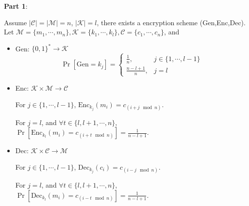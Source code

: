\documentclass[12pt]{article}
\newcommand{\K}{\mathcal{K}}
\newcommand{\M}{\mathcal{M}}
\newcommand{\C}{\mathcal{C}}
\newcommand{\Enc}{\text{Enc}}
\newcommand{\Dec}{\text{Dec}}
\newcommand{\Gen}{\text{Gen}}
\newenvironment{problem}[2][Problem]{\begin{trivlist}
\item[\hskip \labelsep {\bfseries #1}\hskip \labelsep {\bfseries #2.}]}{\end{trivlist}}
\begin{document}
\begin{problem}{2.11} 
\textbf{Part 1}:\par
Assume $\mid\C\mid=\mid\M\mid=n$, $\mid\K\mid=l$, there exists a encryption scheme (Gen,Enc,Dec). Let $\M=\{m_1,\cdots,m_n\},\K=\{k_1,\cdots,k_l\},\C=\{c_1,\cdots,c_n\}$, and\begin{itemize}
    \item Gen: $\{0,1\}^*\rightarrow\K$
		\begin{equation*}  
			\Pr[\Gen=k_j]= \begin{cases}
					\frac 1n, &  j\in\{1,\cdots,l-1\} \\  
					\frac {n-l+1}{n}, & j=l  
				\end{cases} 
		\end{equation*}
    \item Enc: $\K\times\M\rightarrow\C$\par
    For $j\in\{1,\cdots,l-1\}$, $\Enc_{k_j}(m_i)=c_{(i+j\mod n)}$.\par
    For $j=l$, and $\forall t\in\{l,l+1,\cdots,n\}$, $\Pr[\Enc_{k_l}(m_i)=c_{(i+t \mod n)}]=\frac {1}{n-l+1}$.
    \item Dec: $\K\times\C\rightarrow\M$ \par
    For $j\in\{1,\cdots,l-1\}$, $\Dec_{k_j}(c_i)=c_{(i-j\mod n)}$.\par
    For $j=l$, and $\forall t\in\{l,l+1,\cdots,n\}$, $\Pr[\Dec_{k_l}(m_i)=c_{(i-t \mod n)}]=\frac {1}{n-l+1}$.
\end{itemize}\par


\end{problem}
\end{document}
